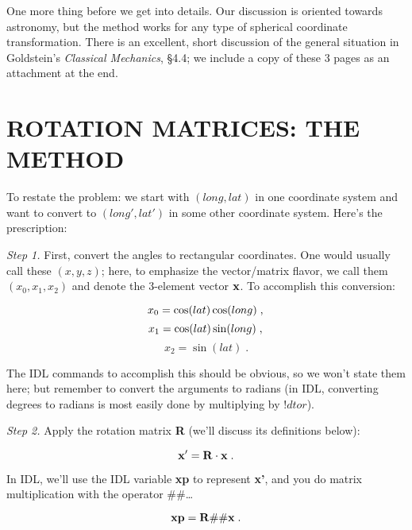 	One more thing before we get into details. Our discussion is
oriented towards astronomy, but the method works for any type of
spherical coordinate transformation. There is an excellent, short
discussion of the general situation in Goldstein's {\it Classical
Mechanics}, \S 4.4; we include a copy of these 3 pages as an attachment
at the end.

\section {ROTATION MATRICES: THE METHOD}

	To restate the problem: we start with $(long, lat)$ in one
coordinate system and want to convert to $(long', lat')$ in some other
coordinate system. Here's the prescription:

	{\it Step 1.} First, convert the angles to rectangular
coordinates.  One would usually call these $(x, y, z)$; here, to
emphasize the vector/matrix flavor, we call them $(x_0, x_1, x_2)$ and
denote the 3-element vector ${\bf x}$.  To accomplish this conversion:

\begin{mathletters}
\begin{equation}
x_0 = \cos(lat) \cos(long) \; , \\
\end{equation}
\begin{equation}
x_1 = \cos(lat) \sin(long) \; , \\
\end{equation}
\begin{equation}
x_2 = \sin(lat) \; .
\end{equation}
\end{mathletters}

\noindent The IDL commands to accomplish this should be obvious, so we
won't state them here; but remember to convert the arguments to radians
(in IDL, converting degrees to radians is most easily done by
multiplying by $!dtor$). 

	{\it Step 2.} Apply the rotation matrix {\bf R} (we'll discuss its
definitions below): 

\begin{equation}
{\bf x'} = {\bf R \cdot x} \; .
\end{equation}

\noindent In IDL, we'll use the IDL variable {\bf xp} to represent {\bf
x'}, and you do matrix multiplication with the operator $\#\#$\dots

\begin{equation}
{\bf xp} = {\bf R} \#\# {\bf x} \; .
\end{equation}

